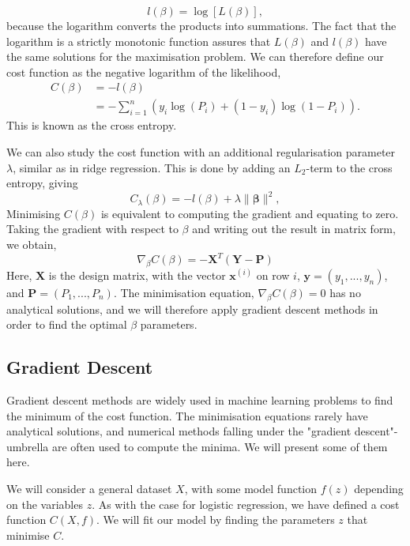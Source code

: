 \documentclass[a4paper,
amsfonts,
amssymb,
amsmath,
reprint,
showkeys,
nofootinbib,
twoside]{revtex4-2}
\begin{document}
\begin{equation}
    l(\beta) = \log [L(\beta)],
\end{equation}
because the logarithm converts the products into summations. The fact that the logarithm is a strictly monotonic function assures that $L(\beta)$ and $l(\beta)$ have the same solutions for the maximisation problem. We can therefore define our cost function as the negative logarithm of the likelihood,
\begin{equation}
\begin{split}
    C(\beta) &= -l(\beta) \\
    &= -\sum_{i = 1}^n (y_i \log (P_i) + (1 - y_i)\log(1 - P_i)).
\end{split}
\label{eq:cost}
\end{equation}
This is known as the cross entropy.

We can also study the cost function with an additional regularisation parameter $\lambda$, similar as in ridge regression. This is done by adding an $L_2$-term to the cross entropy, giving
\begin{equation}
    C_{\lambda}(\beta) = -l(\beta) + \lambda \lVert \bm{\beta}\rVert^2,
    \label{eq:ridge}
\end{equation}
Minimising $C(\beta)$ is equivalent to computing the gradient and equating to zero.  Taking the gradient with respect to $\beta$ and writing out the result in matrix form, we obtain,
\begin{equation}
    \nabla_{\beta}C(\beta) = - \bm{X}^T(\bm{Y} - \bm{P})
\end{equation}
Here, $\bm{X}$ is the design matrix, with the vector $\bm{x}^{(i)}$ on row $i$, $\bm{y} = (y_1, ..., y_n)$, and $\bm{P} = (P_1, ..., P_n)$.
The minimisation equation, $\nabla_{\beta}C(\beta) = 0$ has no analytical solutions, and we will therefore apply gradient descent methods in order to find the optimal $\beta$ parameters.

\subsection{Gradient Descent}
Gradient descent methods are widely used in machine learning problems to find the minimum of the cost function. The minimisation equations rarely have analytical solutions, and numerical methods falling under the "gradient descent"-umbrella are often used to compute the minima. We will present some of them here.

We will consider a general dataset $X$, with some model function $f(z)$ depending on the variables $z$. As with the case for logistic regression, we have defined a cost function $C(X, f)$. We will fit our model by finding the parameters $z$ that minimise $C$.
\end{document}
